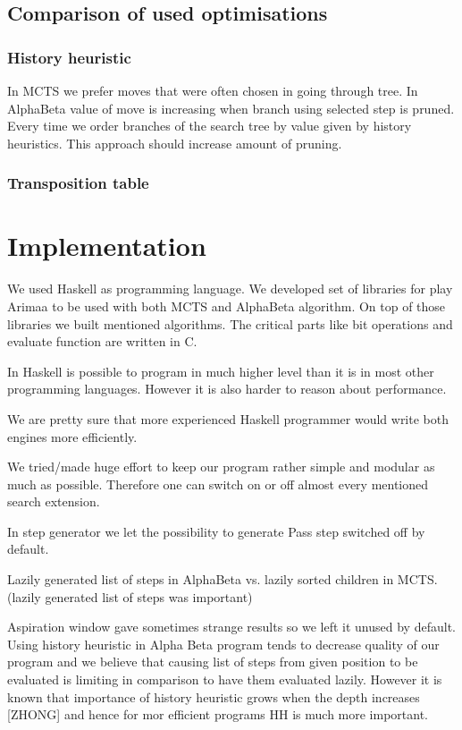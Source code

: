 \documentclass[12pt,titlepage,fleqn]{report}
\begin{document}
\section{Comparison of used optimisations}

\subsection{History heuristic}
In MCTS we prefer moves that were often chosen in going through tree. In
AlphaBeta value of move is increasing when branch using selected step is
pruned. Every time we order branches of the search tree by value given by
history heuristics. This approach should increase amount of pruning.

\subsection{Transposition table}


\chapter{Implementation}
We used Haskell as programming language. We developed set of libraries for play
Arimaa to be used with both MCTS and AlphaBeta algorithm. On top of those
libraries we built mentioned algorithms. The critical parts like bit operations
and evaluate function are written in C.

In Haskell is possible to program in much higher level than it is in most other
programming languages. However it is also harder to reason about performance.

We are pretty sure that more experienced Haskell programmer would write both
engines more efficiently.


We tried/made huge effort to keep our program rather simple and modular as much
as possible. Therefore one can switch on or off almost every mentioned search
extension.

In step generator we let the possibility to generate Pass step switched off by
default.

Lazily generated list of steps in AlphaBeta vs. lazily sorted children in MCTS.
(lazily generated list of steps was important)

Aspiration window gave sometimes strange results so we left it unused by default.
Using history heuristic in Alpha Beta program tends to decrease quality of our
program and we believe that causing list of steps from given position to be
evaluated is limiting in comparison to have them evaluated lazily. However it
is known that importance of history heuristic grows when the depth increases
[ZHONG] and hence for mor efficient programs HH is much more important.
\end{document}

